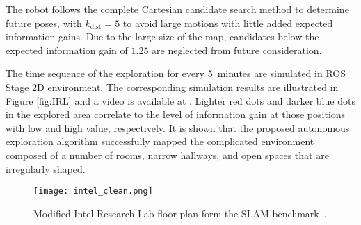 The robot follows the complete Cartesian candidate search method to determine future poses, with $k_\text{dist}=5$ to avoid large motions with little added expected information gains. Due to the large size of the map, candidates below the expected information gain of $1.25$ are neglected from future consideration.

The time sequence of the exploration for every 5~minutes are simulated in ROS Stage 2D environment. The corresponding simulation results are illustrated in Figure \ref{fig:IRL} and a video is available at \href{https://www.youtube.com/watch?v=5VdzKHreB_s}{}.
Lighter red dots and darker blue dots in the explored area correlate to the level of information gain at those positions with low and high value, respectively. It is shown that the proposed autonomous exploration algorithm successfully mapped the complicated environment composed of a number of rooms, narrow hallways, and open spaces that are irregularly shaped.


\begin{figure}
    \centering
    \texttt{[image: intel\_clean.png]}
    \caption{Modified Intel Research Lab floor plan form the SLAM benchmark~\cite{kummerle2009measuring}.}
\label{fig:intel}
\end{figure}


